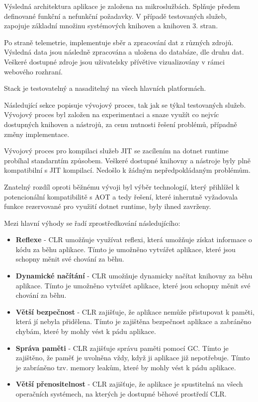 


Výsledná architektura aplikace je založena na mikroslužbách. Splňuje předem definované funkční a nefunkční požadavky. V případě testovaných služeb, zapojuje základní množinu systémových knihoven a knihoven 3. stran.

Po straně telemetrie, implementuje sběr a zpracování dat z různých zdrojů. Výsledná data jsou následně zpracována a uložena do databáze, dle druhu dat. Veškeré dostupné zdroje jsou uživatelsky přívětive vizualizovány v rámci webového rozhraní.

Stack je testovatelný a nasaditelný na všech hlavních platformách.


Následující sekce popisuje vývojový proces, tak jak se týkal testovaných služeb. Vývojový proces byl založen na experimentaci a snaze využít co nejvíc dostupných knihoven a nástrojů, za cenu nutnosti řešení problémů, případně změny implementace.


Vývojový proces pro kompilaci služeb JIT se zacílením na dotnet runtime probíhal standarntím způsobem. Veškeré dostupné knihovny a nástroje byly plně kompatibilní s JIT kompilací. Nedošlo k žádným nepředpokládaným problémům.

Znatelný rozdíl oproti běžnému vývoji byl výběr technologií, který přihlížel k potencionální kompatibilitě s AOT a tedy řešení, které inherntně vyžadovala funkce rezervované pro využití dotnet runtime, byly ihned zavrženy.


Mezi hlavní výhody se řadí zprostředkování následujícího:

\begin{itemize}
    \item  \textbf{Reflexe} - CLR umožňuje využívat reflexi, která umožňuje získat informace o kódu za běhu aplikace. Tímto je umožněno vytvářet aplikace, které jsou schopny měnit své chování za běhu.
    \item \textbf{Dynamické načítání} - CLR umožňuje dynamicky načítat knihovny za běhu aplikace. Tímto je umožněno vytvářet aplikace, které jsou schopny měnit své chování za běhu.
    \item \textbf{Větší bezpečnost} - CLR zajišťuje, že aplikace nemůže přistupovat k paměti, která jí nebyla přidělena. Tímto je zajištěna bezpečnost aplikace a zabráněno chybám, které by mohly vést k pádu aplikace.
    \item \textbf{Správa paměti} - CLR zajišťuje správu paměti pomocí GC. Tímto je zajištěno, že paměť je uvolněna vždy, když ji aplikace již nepotřebuje. Tímto je zabráněno tzv. memory leakům, které by mohly vést k pádu aplikace.
    \item \textbf{Větší přenositelnost} - CLR zajišťuje, že aplikace je spustitelná na všech operačních systémech, na kterých je dostupné běhové prostředí CLR.
\end{itemize}

